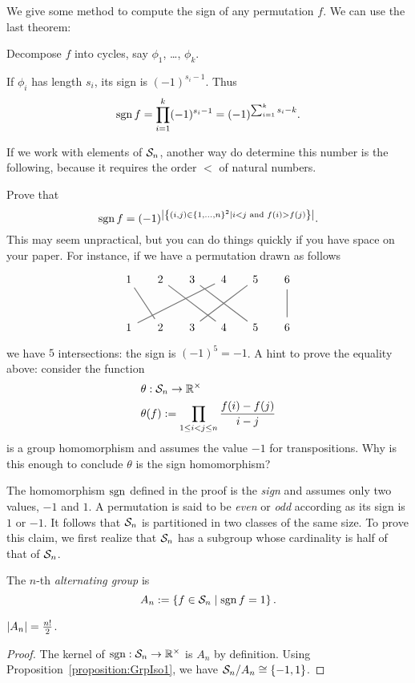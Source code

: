 We give some method to compute the sign of any permutation \(f\). We can use the last theorem:
\begin{tcbenum}
\item Decompose \(f\) into cycles, say \(\phi_1\), \dots{}, \(\phi_k\).
\item If \(\phi_i\) has length \(s_i\), its sign is \((-1)^{s_i-1}\). Thus
\[\operatorname{sgn} f = \prod_{i=1}^k (-1)^{s_i-1} = (-1)^{\sum_{i=1}^k s_i -k} .\]
\end{tcbenum}

If we work with elements of \(\mathcal S_n\), another way do determine this number is the following, because it requires the order \(<\) of natural numbers.

\begin{exercise}
Prove that
\[\operatorname{sgn} f = (-1)^{\left\lvert\left\{(i, j) \in \left\{1, \dots{}, n\right\}^2 \mid i < j \text{ and } f(i) > f(j)\right\}\right\rvert} .\]
This may seem unpractical, but you can do things quickly if you have space on your paper. For instance, if we have a permutation drawn as follows
\[\begin{tikzpicture}
\foreach \i/\j in {1/2, 2/4, 3/5, 4/1, 5/3, 6/6} {
	\node (x\i) [circle] at (\i cm, .75cm) {\(\i\)};
	\node (y\j) [circle] at (\j cm, -.75cm) {\(\j\)};
	\draw [thick, white!45!black] (x\i) -- (y\j);
}
\end{tikzpicture}\]
we have \(5\) intersections: the sign is \((-1)^5 = -1\). A hint to prove the equality above: consider the function
\begin{align*}
& \theta : \mathcal S_n \to \mathbb R^\times \\
& \theta(f) := \prod_{1 \le i < j \le n} \frac{f(i)-f(j)}{i-j}
\end{align*}
is a group homomorphism and assumes the value \(-1\) for transpositions. Why is this enough to conclude \(\theta\) is the sign homomorphism? 
\end{exercise}

The homomorphism \(\operatorname{sgn}\) defined in the proof is the {\em sign} and assumes only two values, \(-1\) and \(1\). A permutation is said to be {\em even} or {\em odd} according as its sign is \(1\) or \(-1\). It follows that \(\mathcal S_n\) is partitioned in two classes of the same size. To prove this claim, we first realize that \(\mathcal S_n\) has a subgroup whose cardinality is half of that of \(\mathcal S_n\).

\begin{definition}
The \(n\)-th {\em alternating group} is
\[A_n := \left\{f \in \mathcal S_n \mid \operatorname{sgn} f = 1\right\} .\]
\end{definition}

\begin{proposition}
\(\left\lvert A_n\right\rvert = \frac{n!}{2}\).
\end{proposition}

\begin{proof}
The kernel of \(\operatorname{sgn} : \mathcal S_n \to \mathbb R^\times\) is \(A_n\) by definition. Using Proposition~\ref{proposition:GrpIso1}, we have \({\mathcal S_n}{/}{A_n} \cong \left\{-1, 1\right\}\).
\end{proof}
